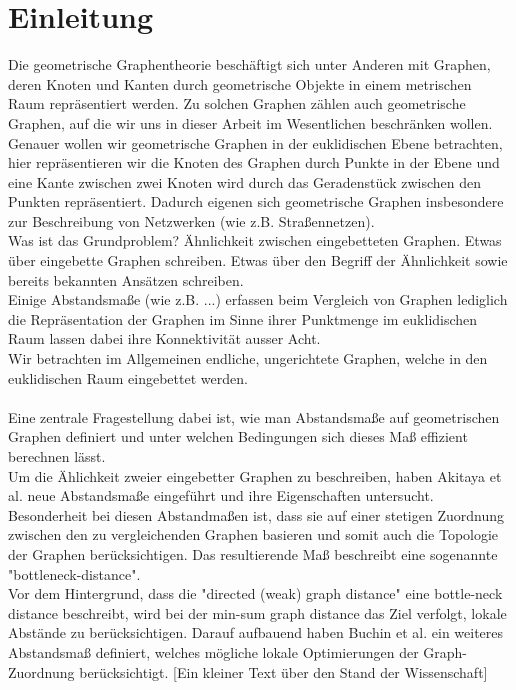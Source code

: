 \documentclass[a4paper, 12pt, twoside]{article}
\theoremstyle{Format1} %
\begin{document}
\newpage
\tableofcontents
\newpage\null\thispagestyle{empty}\newpage %
\section{Einleitung}

Die geometrische Graphentheorie beschäftigt sich unter Anderen mit Graphen, deren Knoten und Kanten durch geometrische Objekte in einem metrischen Raum repräsentiert werden.
Zu solchen Graphen zählen auch geometrische Graphen, auf die wir uns in dieser Arbeit im Wesentlichen beschränken wollen. Genauer wollen wir geometrische Graphen in der euklidischen Ebene betrachten,
hier repräsentieren wir die Knoten des Graphen durch Punkte in der Ebene und eine Kante zwischen zwei Knoten wird durch das Geradenstück zwischen den Punkten repräsentiert.
Dadurch eigenen sich geometrische Graphen insbesondere zur Beschreibung von Netzwerken (wie z.B. Straßennetzen).
\\
Was ist das Grundproblem? Ähnlichkeit zwischen eingebetteten Graphen. Etwas über eingebette Graphen schreiben. Etwas über den Begriff der Ähnlichkeit sowie bereits bekannten Ansätzen schreiben.
\\
Einige Abstandsmaße (wie z.B. ...) erfassen beim Vergleich von Graphen lediglich die Repräsentation der Graphen im Sinne ihrer Punktmenge im euklidischen Raum lassen dabei ihre Konnektivität ausser Acht.
\\
Wir betrachten im Allgemeinen endliche, ungerichtete Graphen, welche in den euklidischen Raum eingebettet werden.
\\
\\
Eine zentrale Fragestellung dabei ist, wie man Abstandsmaße auf geometrischen Graphen definiert und unter welchen Bedingungen sich dieses Maß effizient berechnen lässt.
\\
Um die Ählichkeit zweier eingebetter Graphen zu beschreiben, haben Akitaya et al. \cite{Akitaya} neue Abstandsmaße eingeführt und ihre Eigenschaften untersucht.
\\
Besonderheit bei diesen Abstandmaßen ist, dass sie auf einer stetigen Zuordnung zwischen den zu vergleichenden Graphen basieren und somit auch die Topologie der Graphen berücksichtigen.
Das resultierende Maß beschreibt eine sogenannte "bottleneck-distance".
\\
Vor dem Hintergrund, dass die "directed (weak) graph distance" eine bottle-neck distance beschreibt, wird bei der min-sum graph distance das Ziel verfolgt, lokale Abstände zu berücksichtigen.
Darauf aufbauend haben \cite{Buchin} Buchin et al. ein weiteres Abstandsmaß definiert, welches mögliche lokale Optimierungen der Graph-Zuordnung berücksichtigt.
[Ein kleiner Text über den Stand der Wissenschaft]
\end{document}
